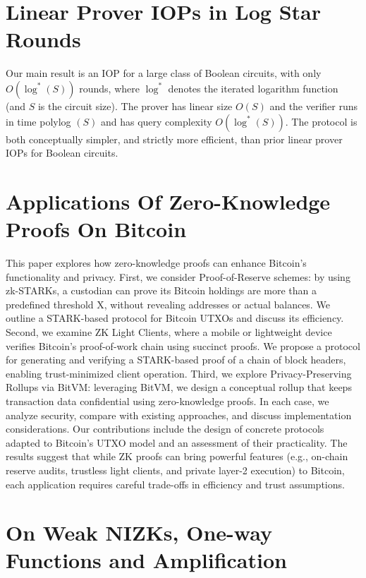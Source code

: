 \documentclass[11pt]{article}
\theoremstyle{definition}
\theoremstyle{remark}
\theoremstyle{plain}
\begin{document}
\section{\cite{cryptoeprint:2025/1269} Linear Prover {IOPs} in Log Star Rounds}
Our main result is an IOP for a large class of Boolean circuits, with only $O\left(\log ^*(S)\right)$ rounds, where $\log ^*$ denotes the iterated logarithm function (and $S$ is the circuit size). The prover has linear size $O(S)$ and the verifier runs in time polylog $(S)$ and has query complexity $O\left(\log ^*(S)\right)$. The protocol is both conceptually simpler, and strictly more efficient, than prior linear prover IOPs for Boolean circuits.
\section{\cite{cryptoeprint:2025/1271} Applications Of Zero-Knowledge Proofs On Bitcoin}
This paper explores how zero-knowledge proofs can enhance Bitcoin's functionality and privacy. First, we consider Proof-of-Reserve schemes: by using zk-STARKs, a custodian can prove its Bitcoin holdings are more than a predefined threshold X, without revealing addresses or actual balances. We outline a STARK-based protocol for Bitcoin UTXOs and discuss its efficiency. Second, we examine ZK Light Clients, where a mobile or lightweight device verifies Bitcoin's proof-of-work chain using succinct proofs. We propose a protocol for generating and verifying a STARK-based proof of a chain of block headers, enabling trust-minimized client operation. Third, we explore Privacy-Preserving Rollups via BitVM: leveraging BitVM, we design a conceptual rollup that keeps transaction data confidential using zero-knowledge proofs. In each case, we analyze security, compare with existing approaches, and discuss implementation considerations. Our contributions include the design of concrete protocols adapted to Bitcoin's UTXO model and an assessment of their practicality. The results suggest that while ZK proofs can bring powerful features (e.g., on-chain reserve audits, trustless light clients, and private layer-2 execution) to Bitcoin, each application requires careful trade-offs in efficiency and trust assumptions.
\section{\cite{cryptoeprint:2025/1276} On Weak NIZKs, One-way Functions and Amplification}
\end{document}
